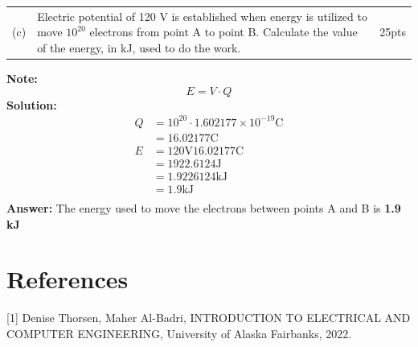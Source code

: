 \documentclass{article}
\newcommand{\problemstatement}[3]{
\noindent
\begin{tabular}{ m{0.5cm} m{42em} m{0.5cm} }
	({#1}) & {#2} & {#3}pts
\end{tabular}
}
\begin{document}
\newpage
\problemstatement{c}{Electric potential of 120 V is established when energy is utilized to move $10^{20}$ electrons from point A to point B. Calculate the value of the energy, in kJ, used to do the work.}{25}
\begin{addmargin}[1.5cm]{0em}
	\noindent
	\textbf{Note:} \\
	\begin{equation}
		E=V \cdot Q
	\end{equation}
	\noindent
	\textbf{Solution:} \\
	\begin{align*}
		Q &= 10^{20} \cdot 1.602177 \times 10^{-19}  \text{C} \\
		&= 16.02177  \text{C} \\
		E &= 120  \text{V} 16.02177  \text{C} \\
		&= 1922.6124  \text{J} \\
		&= 1.9226124  \text{kJ} \\
		&= 1.9  \text{kJ} \\
	\end{align*}
	\noindent
	\textbf{Answer:} The energy used to move the electrons between points A and B is \textbf{1.9 kJ} \\
\end{addmargin}

\newpage
\section{References}
[1] Denise Thorsen, Maher Al-Badri, INTRODUCTION TO ELECTRICAL AND COMPUTER ENGINEERING, University of Alaska Fairbanks, 2022.
\end{document}
